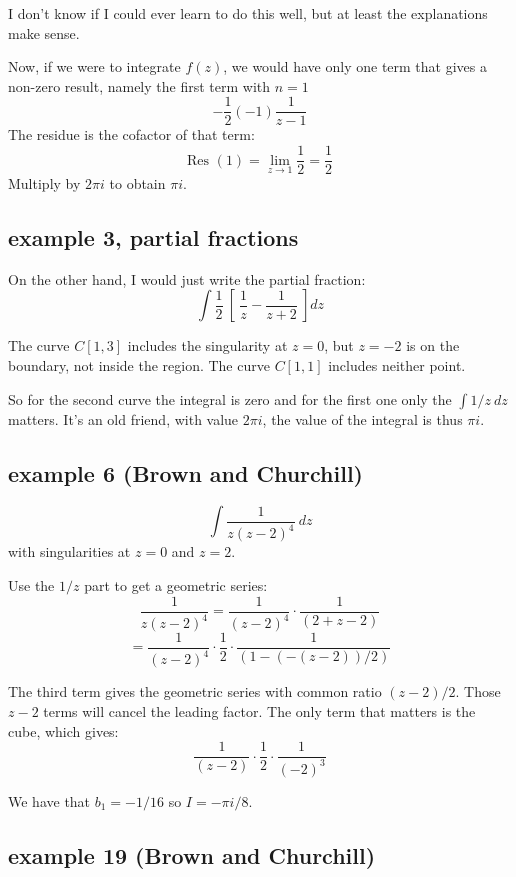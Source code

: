 \documentclass[11pt, oneside]{article}
\begin{document}
I don't know if I could ever learn to do this well, but at least the explanations make sense.

Now, if we were to integrate $f(z)$, we would have only one term that gives a non-zero result, namely the first term with $n=1$
\[ - \frac{1}{2} (-1) \frac{1}{z-1} \]
The residue is the cofactor of that term:
\[ \text{Res }(1) = \lim_{z \rightarrow 1} \frac{1}{2} = \frac{1}{2} \]
Multiply by $2 \pi i$ to obtain $\pi i$.

\subsection*{example 3, partial fractions}

On the other hand, I would just write the partial fraction:
\[ \int \frac{1}{2} \ [ \ \frac{1}{z} - \frac{1}{z + 2} \ ] dz \]

The curve $C[1,3]$ includes the singularity at $z = 0$, but $z = -2$ is on the boundary, not inside the region.  The curve $C[1,1]$ includes neither point.

So for the second curve the integral is zero and for the first one only the $\int 1/z \ dz$ matters.  It's an old friend, with value $2 \pi i$, the value of the integral is thus $\pi i$.

\subsection*{example 6 (Brown and Churchill)}

\label{sec:ex6L}

\[ \int \frac{1}{z(z-2)^4} \ dz \]
with singularities at $z = 0$ and $z = 2$.

Use the $1/z$ part to get a geometric series:
\[ \frac{1}{z(z-2)^4} = \frac{1}{(z-2)^4} \cdot \frac{1}{(2 + z - 2)} \]
\[ = \frac{1}{(z-2)^4} \cdot \frac{1}{2} \cdot \frac{1}{(1 - (-(z-2))/2 )} \]

The third term gives the geometric series with common ratio $(z-2)/2$.  Those $z-2$ terms will cancel the leading factor.  The only term that matters is the cube, which gives:
\[  \frac{1}{(z-2)} \cdot \frac{1}{2} \cdot \frac{1}{(-2)^3} \]

We have that $b_1 = -1/16$ so $I = -\pi i/8$.

\subsection*{example 19 (Brown and Churchill)}
\end{document}

